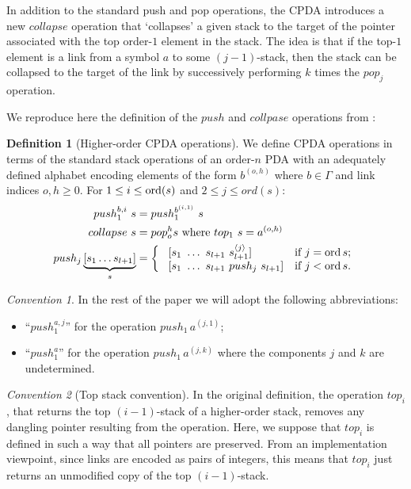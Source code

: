 \documentclass[a4paper]{article}[12pt]
\theoremstyle{remark}
\newtheorem{convention}{Convention}[section]
\theoremstyle{definition}
\newtheorem{definition}{Definition}[section]
\begin{document}
In addition to the standard push and pop operations, the CPDA introduces a new $collapse$ operation that `collapses' a given stack to the target of the pointer associated with the top order-$1$ element in the stack. The idea is that if the top-$1$ element is a link from a symbol $a$ to some $(j - 1)$-stack, then the stack can be collapsed to the target of the link by successively performing $k$ times the $pop_j$ operation.

We reproduce here the definition of the $push$ and $collpase$ operations from \cite{hmos-lics08}:

\begin{definition}[Higher-order CPDA operations]
	\label{cpdastackopearations}
We define CPDA operations in terms of the standard stack operations of an order-$n$ PDA with an adequately defined alphabet encoding elements of the form $b^{(o,h)}$ where $b\in\Gamma$ and link indices $o,h \geq 0$. For $1 \leq i  \leq \mathop{\mathrm{ord}}(s)$ and $2  \leq j  \leq ord(s)$:
\begin{align*}
push_1^{b,i}\ s &= push_1^{b^{(i,1)}}\ s \\
collapse\ s &= pop_o^h s  \hbox{\ where } top_1\ s = a^{(o,h)} \\
push_j \underbrace{[ s_1 \ldots s_{l+1} ]}_{s} &=
\left\{
\begin{array}{ll}
\    [s_1\ \ldots\ s_{l+1}\ s_{l+1}^{\langle j \rangle}]  &\hbox{if $j = \mathop{\mathrm{ord}}{s}$;}\\
\    [s_1\ \ldots\ s_{l+1}\ push_j\ s_{l+1}]  &\hbox{if $j<\mathop{\mathrm{ord}}{s}$.}
\end{array}
\right.
\end{align*}
\end{definition}

\begin{convention}
	In the rest of the paper we will adopt the following abbreviations:
\begin{itemize}
	\item ``$push_1^{a,j}$'' for the operation $push_1\,a^{(j,1)}$;
	\item ``$push_1^a$'' for the operation $push_1\,a^{(j,k)}$ where the components $j$ and $k$ are undetermined.
\end{itemize}
\end{convention}

\begin{convention}[Top stack convention]
\label{conv:top_preserve_links}
In the original definition, the operation $top_i$, that returns the top $(i-1)$-stack of a higher-order stack,
 removes any dangling pointer resulting from the operation. Here, we suppose that $top_i$ is defined in such a way that all pointers are preserved. From an implementation viewpoint, since links are encoded as pairs of integers, this means that $top_i$ just returns an unmodified copy of the top $(i-1)$-stack.
\end{convention}
\end{document}
